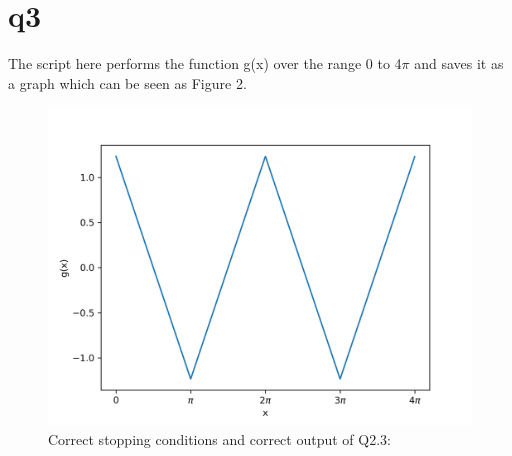 \documentclass[a4paper,english]{article}
\begin{document}
    \section{q3}
        
        The script here performs the function g(x) over the range 0 to 4$\pi$ and saves it as a graph which can be seen as Figure 2.
        \begin{figure}
            \caption{Correct stopping conditions and correct output of Q2.3:}
            \includegraphics[scale=0.7]{./q2_3.png}
        \end{figure}
\end{document}
